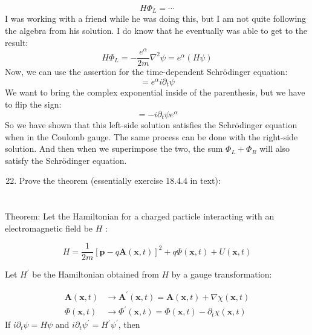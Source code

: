 \documentclass[12pt]{article}
\begin{document}
\begin{equation}
    H \Phi_L = \cdots
\end{equation}
I was working with a friend while he was doing this, but I am not quite following the algebra from his solution. I do know that he eventually was able to get to the result:
\begin{equation}
  H \Phi_L = -\frac{e^{\alpha}}{2m} \nabla^2 \psi = e^{\alpha} \left( H \psi \right)
\end{equation}
Now, we can use the assertion for the time-dependent Schrödinger equation:
\begin{equation}
  = e^{\alpha} i \partial_t \psi 
\end{equation}
We want to bring the complex exponential inside of the parenthesis, but we have to flip the sign:
\begin{equation}
  = -i \partial_t \psi e^{\alpha}
\end{equation}
So we have shown that this left-side solution satisfies the Schrödinger equation when in the Coulomb gauge. The same process can be done with the right-side solution. And then when we superimpose the two, the sum $\Phi_L + \Phi_R$ will also satisfy the Schrödinger equation.
\begin{enumerate}
  \setcounter{enumi}{21}
  \item Prove the theorem (essentially exercise 18.4.4 in text):
\end{enumerate}
\section{}
Theorem: Let the Hamiltonian for a charged particle interacting with an electromagnetic field be $H$ :

$$
H=\frac{1}{2 m}[\mathbf{p}-q \mathbf{A}(\mathbf{x}, t)]^{2}+q \Phi(\mathbf{x}, t)+U(\mathbf{x}, t)
$$

Let $H^{\prime}$ be the Hamiltonian obtained from $H$ by a gauge transformation:

$$
\begin{aligned}
\mathbf{A}(\mathbf{x}, t) & \rightarrow \mathbf{A}^{\prime}(\mathbf{x}, t)=\mathbf{A}(\mathbf{x}, t)+\nabla \chi(\mathbf{x}, t) \\
\Phi(\mathbf{x}, t) & \rightarrow \Phi^{\prime}(\mathbf{x}, t)=\Phi(\mathbf{x}, t)-\partial_{t} \chi(\mathbf{x}, t)
\end{aligned}
$$
If $i \partial_{t} \psi=H \psi$ and $i \partial_{t} \psi^{\prime}=H^{\prime} \psi^{\prime}$, then
\end{document}
